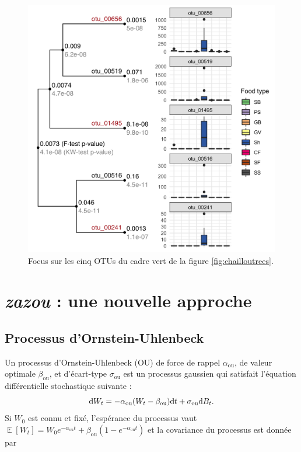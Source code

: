 \documentclass[12pt,a4paper]{reedthesis}
\newcommand \dx [2] [] {\mathrm{d}^{#1}\mspace{-1mu}\mathord{#2}}
\DeclareMathOperator*{\esp}{\mathbb{E}}
\newcommand \EE [1]{\esp\left[{#1}\right]}
\newcommand \ou [1]{{#1}_{\text{ou}}}
\newcommand \optim {\beta}
\theoremstyle{definition}
\theoremstyle{definition}
\theoremstyle{definition}
\theoremstyle{remark}
\begin{document}
\begin{figure}

{\centering \includegraphics[width=0.9\linewidth]{img/chaillou_zoom} 

}

\caption{Focus sur les cinq OTUs du cadre vert de la figure \ref{fig:chailloutrees}.}\label{fig:chaillouzoom}
\end{figure}
\hypertarget{nouvelleapproche}{%
\chapter{\texorpdfstring{\emph{zazou} : une nouvelle approche}{zazou : une nouvelle approche}}\label{nouvelleapproche}}

\hypertarget{ou}{%
\section{Processus d'Ornstein-Uhlenbeck}\label{ou}}

Un processus d'Ornstein-Uhlenbeck (OU) de force de rappel \(\ou{\alpha}\), de valeur optimale \(\ou{\optim}\), et d'écart-type \(\ou{\sigma}\) est un processus gaussien qui satisfait l'équation différentielle stochastique suivante :
\begin{equation*}
\dx{W_t} = - \ou{\alpha} (W_t - \ou{\optim}) \dx{t} + \ou{\sigma}\dx{B_t}.
\end{equation*}
Si \(W_0\) est connu et fixé, l'espérance du processus vaut \(\EE{W_t} = W_0 e^{-\ou{\alpha} t} + \ou{\optim}\left(1 - e^{-\ou{\alpha} t}\right)\) et la covariance du processus est donnée par
\end{document}
